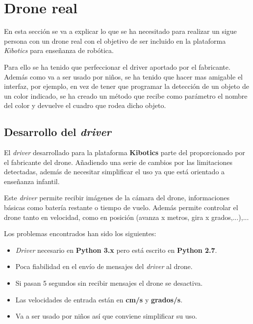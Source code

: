 \chapter{Drone real}\label{cap.clasificacion}
En esta sección se va a explicar lo que se ha necesitado para realizar un sigue persona con un drone real con el objetivo de ser incluido en la plataforma \textit{Kibotics} para enseñanza de robótica.

Para ello se ha tenido que perfeccionar el driver aportado por el fabricante\cite{tello_driver}. Además como va a ser usado por niños, se ha tenido que hacer mas amigable el interfaz, por ejemplo, en vez de tener que programar la detección de un objeto de un color indicado, se ha creado un método que recibe como parámetro el nombre del color y devuelve el cuadro que rodea dicho objeto.

\section{Desarrollo del \textit{driver}}
El \textit{driver} desarrollado para la plataforma \textbf{Kibotics} parte del proporcionado por el fabricante del drone. Añadiendo una serie de cambios por las limitaciones detectadas, además de necesitar simplificar el uso ya que está orientado a enseñanza infantil. 

Este \textit{driver} permite recibir imágenes de la cámara del drone, informaciones básicas como batería restante o tiempo de vuelo. Además permite controlar el drone tanto en velocidad, como en posición (avanza x metros, gira x grados,...),... 

Los problemas encontrados han sido los siguientes:
\begin{itemize}
  \item \textit{Driver} necesario en \textbf{Python 3.x} pero está escrito en \textbf{Python 2.7}. 
  \item Poca fiabilidad en el envío de mensajes del \textit{driver} al drone.
  \item Si pasan 5 segundos sin recibir mensajes el drone se desactiva.
  \item Las velocidades de entrada están en \textbf{cm/s} y \textbf{grados/s}.
  \item Va a ser usado por niños así que conviene simplificar su uso. 
\end{itemize}
